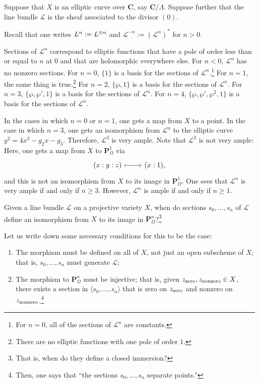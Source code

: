 \documentclass [11 pt, oneside] {article}
\begin{document}
\begin{example}\label{}\text{}
Suppose that $X$ is an elliptic curve over $\mathbf{C}$, say $\mathbf{C}/\Lambda$. Suppose further that the line bundle $\mathscr{L}$ is the sheaf associated to the divisor $(0)$.

Recall that one writes $\relax{L}^n := \relax{L}^{\otimes n}$ and $\mathscr{L}^{-n} := (\mathscr{L}^n)^*$ for $n>0$.

Sections of $\mathscr{L}^n$ correspond to elliptic functions that have a pole of order less than or equal to $n$ at $0$ and that are holomorphic everywhere else. For $n<0$, $\mathscr{L}^n$ has no nonzero sections. For $n=0$, $\{1\}$ is a basis for the sections of $\mathscr{L}^n$.\footnote{For $n=0$, all of the sections of $\mathscr{L}^n$ are constants.}
For $n=1$, the same thing is true.\footnote{There are no elliptic functions with one pole of order $1$.}
For $n=2$, $\{\wp,1\}$ is a basis for the sections of $\mathscr{L}^n$. 
For $n=3$, $\{\wp,\wp',1\}$ is a basis for the sections of $\mathscr{L}^n$.
For $n=4$, $\{\wp,\wp',\wp^2, 1\}$ is a basis for the sections of $\mathscr{L}^n$.

In the cases in which $n=0$ or $n=1$, one gets a map from $X$ to a point. In the case in which $n=3$, one gets an isomorphism from $\mathscr{L}^n$ to the elliptic curve $y^2 = 4x^3 - g_2x-g_3$. Therefore, $\mathscr{L}^3$ is very ample.
Note that $\mathscr{L}^2$ is not very ample: Here, one gets a map from $X$ to $\mathbf{P}^1_\Omega$ via
\[
\begin{tikzcd}
	(x:y:z)\ar[r,mapsto] &  (x:1),
\end{tikzcd}
\]
and this is not an isomorphism from $X$ to its image in $\mathbf{P}^1_\Omega$.
One sees that $\mathscr{L}^n$ is very ample if and only if $n \ge 3$. However, $\mathscr{L}^n$ is ample if and only if $n \ge 1$.
\end{example}

\begin{problem}
	Given a line bundle $\mathscr{L}$ on a projective variety $X$, when do sections $s_0,\hdots, s_n$ of $\mathscr{L}$ define an isomorphism from $X$ to its image in $\mathbf{P}^n_\Omega$?\footnote{That is, when do they define a closed immersion?}
\end{problem}
Let us write down some necessary conditions for this to be the case:
\begin{enumerate}
	\item The morphism must be defined on all of $X$, not just an open subscheme of $X$; that is, $s_0,\hdots,s_n$ must generate $\mathscr{L}$;
	\item The morphism to $\mathbf{P}^n_\Omega$ must be injective; that is, given $z_{\textup {zero}},z_{\textup {nonzero}}\in X$, there exists a section in $\langle s_0,\hdots, s_n\rangle$ that is zero on $z_{\textup {zero}}$ and nonzero on $z_{\textup {nonzero}}$.\footnote{Then, one says that ``the sections $s_0,\hdots, s_n$ separate points.''}
\end{enumerate}
\end{document}
